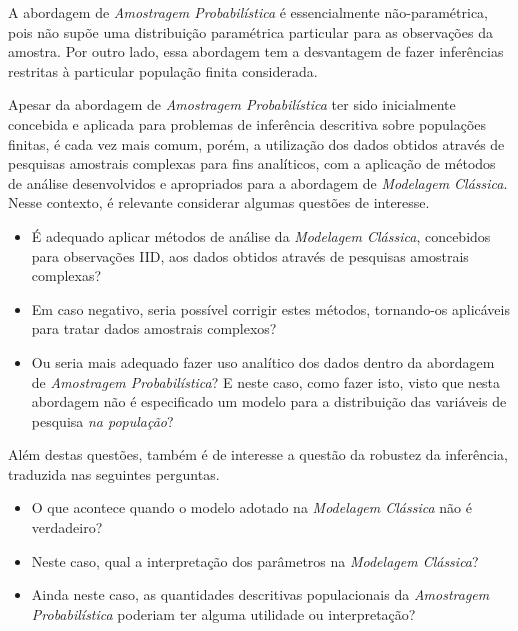 \documentclass[
  12pt,
  brazilian,
]{book}
\theoremstyle{definition}
\theoremstyle{definition}
\theoremstyle{definition}
\theoremstyle{definition}
\theoremstyle{remark}
\begin{document}
A abordagem de \emph{Amostragem Probabilística} é essencialmente não-paramétrica,
pois não supõe uma distribuição paramétrica particular para as observações da
amostra. Por outro lado, essa abordagem tem a desvantagem de fazer inferências
restritas à particular população finita considerada.

Apesar da abordagem de \emph{Amostragem Probabilística} ter sido inicialmente
concebida e aplicada para problemas de inferência descritiva sobre populações
finitas, é cada vez mais comum, porém, a utilização dos dados obtidos através de
pesquisas amostrais complexas para fins analíticos, com a aplicação de métodos
de análise desenvolvidos e apropriados para a abordagem de \emph{Modelagem Clássica}.
Nesse contexto, é relevante considerar algumas questões de interesse.

\begin{itemize}
\item
  É adequado aplicar métodos de análise da \emph{Modelagem Clássica}, concebidos
  para observações IID, aos dados obtidos através de pesquisas amostrais
  complexas?
\item
  Em caso negativo, seria possível corrigir estes métodos, tornando-os
  aplicáveis para tratar dados amostrais complexos?
\item
  Ou seria mais adequado fazer uso analítico dos dados dentro da abordagem de
  \emph{Amostragem Probabilística}? E neste caso, como fazer isto, visto que nesta
  abordagem não é especificado um modelo para a distribuição das variáveis de
  pesquisa \emph{na população}?
\end{itemize}

Além destas questões, também é de interesse a questão da robustez da inferência,
traduzida nas seguintes perguntas.

\begin{itemize}
\item
  O que acontece quando o modelo adotado na \emph{Modelagem Clássica} não é
  verdadeiro?
\item
  Neste caso, qual a interpretação dos parâmetros na \emph{Modelagem Clássica}?
\item
  Ainda neste caso, as quantidades descritivas populacionais da \emph{Amostragem
  Probabilística} poderiam ter alguma utilidade ou interpretação?
\end{itemize}
\end{document}
